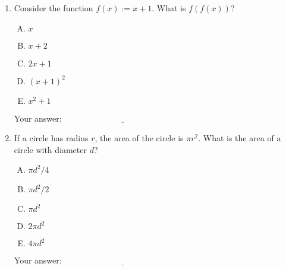 \documentclass[10pt]{amsart}
\begin{document}
\begin{enumerate}
\item Consider the function $f(x) := x + 1$. What is $f(f(x))$?

  \begin{enumerate}[(A)]
  \item $x$
  \item $x + 2$
  \item $2x + 1$
  \item $(x + 1)^2$
  \item $x^2 + 1$
  \end{enumerate}

  \vspace{0.1in}
  Your answer: $\underline{\qquad\qquad\qquad\qquad\qquad\qquad\qquad}$
  \vspace{1in}

\item If a circle has radius $r$, the area of the circle is $\pi
  r^2$. What is the area of a circle with diameter $d$?

  \begin{enumerate}[(A)]
  \item $\pi d^2/4$
  \item $\pi d^2/2$
  \item $\pi d^2$
  \item $2\pi d^2$
  \item $4\pi d^2$
  \end{enumerate}

  \vspace{0.1in}
  Your answer: $\underline{\qquad\qquad\qquad\qquad\qquad\qquad\qquad}$
  \vspace{1in}
  
\end{enumerate}
\end{document}
